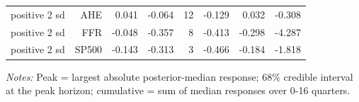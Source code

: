 \begin{table}[htbp]
\begin{tabular}{lrrrrrrr}
positive 2 sd & AHE & 0.041 & -0.064 & 12 & -0.129 & 0.032 & -0.308 \\
positive 2 sd & FFR & -0.048 & -0.357 & 8 & -0.413 & -0.298 & -4.287 \\
positive 2 sd & SP500 & -0.143 & -0.313 & 3 & -0.466 & -0.184 & -1.818 \\
\bottomrule
\end{tabular}
\begin{minipage}{0.95\linewidth}\footnotesize\emph{Notes:} Peak = largest absolute posterior-median response; 68\% credible interval at the peak horizon; cumulative = sum of median responses over 0-16 quarters.\end{minipage}
\end{table}